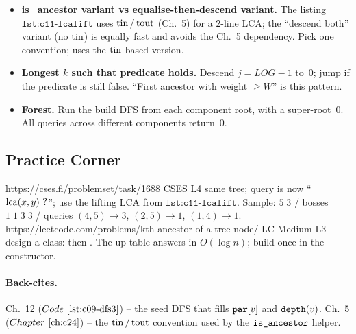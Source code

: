 \begin{itemize}[nosep]
  \item \textbf{is\_ancestor variant vs equalise-then-descend variant.}
        The listing \(\texttt{lst:c11-lcalift}\) uses \(\operatorname{tin}/\operatorname{tout}\)
        (Ch.~5) for a \(2\)-line LCA; the ``descend both'' variant (no
        \(\operatorname{tin}\)) is equally fast and avoids the Ch.~5 dependency.
        Pick one convention;  uses the
        \(\operatorname{tin}\)-based version.  \hfill{}
  \item \textbf{Longest \(k\) such that predicate holds.}  Descend
        \(j = \mathit{LOG}\!-\!1\) to~0; jump if the predicate is still false.
        ``First ancestor with weight \(\ge W\)'' is this pattern.  \hfill{}
  \item \textbf{Forest.}  Run the build DFS from each component root,
        with a super-root~0.  All queries across different components
        return~0.  \hfill{}
\end{itemize}

\subsection{Practice Corner}

\begin{practiceset}
    {https://cses.fi/problemset/task/1688}
    {CSES L4}
    {same tree; query is now ``\(\operatorname{lca}(x,y)~\text{?}\)''; use the lifting
     LCA from \(\texttt{lst:c11-lcalift}\).  Sample: \(5\;3\) / bosses
     \(1\;1\;3\;3\) / queries \((4,5)\to3\), \((2,5)\to1\), \((1,4)\to1\).}
    {https://leetcode.com/problems/kth-ancestor-of-a-tree-node/}
    {LC Medium L3}
    {design a class:  then
     .  The up-table answers in \(O(\log n)\); build
     once in the constructor.}
\end{practiceset}

\paragraph{Back-cites.}
Ch.~12 (\(\coderef{c09-dfs3}\)) -- the seed DFS that fills
\(\texttt{par}[v]\) and \(\texttt{depth}(v)\).
Ch.~5 (\(\chref{c24}\)) -- the \(\operatorname{tin}/\operatorname{tout}\) convention used by the
\(\texttt{is\_ancestor}\) helper.

